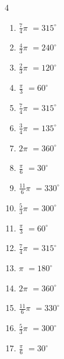 \begin{multicols}{4}
\begin{enumerate}
  \item $\displaystyle \frac{7}{4}\pi$
        $\displaystyle =315^{\circ}$

  \item $\displaystyle \frac{4}{3}\pi$
        $\displaystyle =240^{\circ}$

  \item $\displaystyle \frac{2}{3}\pi$
        $\displaystyle =120^{\circ}$

  \item $\displaystyle \frac{\pi}{3}$
        $\displaystyle =60^{\circ}$

  \item $\displaystyle \frac{7}{4}\pi$
        $\displaystyle =315^{\circ}$

  \item $\displaystyle \frac{3}{4}\pi$
        $\displaystyle =135^{\circ}$

  \item $\displaystyle 2\pi$
        $\displaystyle =360^{\circ}$

  \item $\displaystyle \frac{\pi}{6}$
        $\displaystyle =30^{\circ}$

  \item $\displaystyle \frac{11}{6}\pi$
        $\displaystyle =330^{\circ}$

  \item $\displaystyle \frac{5}{3}\pi$
        $\displaystyle =300^{\circ}$

  \item $\displaystyle \frac{\pi}{3}$
        $\displaystyle =60^{\circ}$

  \item $\displaystyle \frac{7}{4}\pi$
        $\displaystyle =315^{\circ}$

  \item $\displaystyle \pi$
        $\displaystyle =180^{\circ}$

  \item $\displaystyle 2\pi$
        $\displaystyle =360^{\circ}$

  \item $\displaystyle \frac{11}{6}\pi$
        $\displaystyle =330^{\circ}$

  \item $\displaystyle \frac{5}{3}\pi$
        $\displaystyle =300^{\circ}$

  \item $\displaystyle \frac{\pi}{6}$
        $\displaystyle =30^{\circ}$


\end{enumerate}
\end{multicols}
